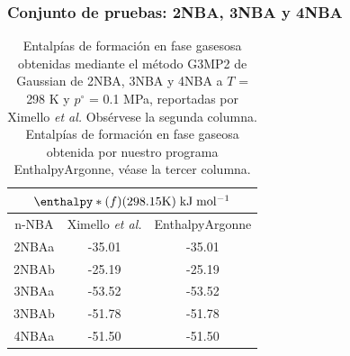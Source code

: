 \documentclass{beamer}
\begin{document}
\begin{frame}
\frametitle{Conjunto de pruebas: 2NBA, 3NBA y 4NBA}
\begin{table}[H]
\centering
\begin{tabular}{|c|c|c|}
\hline
	\multicolumn{3}{||c||}{$\enthalpy*(f){}(298.15 \mathrm{K})\; \mathrm{kJ\;mol^{-1}}$}\\
\hline
\hline
	n-NBA & Ximello \textit{et al.} & EnthalpyArgonne\\ 
\hline
2NBAa & -35.01 & -35.01\\
\hline
2NBAb & -25.19 & -25.19\\ 
\hline 
3NBAa & -53.52 & -53.52\\
\hline
3NBAb & -51.78 & -51.78\\ 
\hline
4NBAa & -51.50 & -51.50\\ 
\hline  
\end{tabular} 
	\caption{Entalpías de formación en fase gasesosa obtenidas mediante el método G3MP2 de Gaussian de 2NBA, 3NBA y 4NBA a $T$ = 298 K y $p^{\circ}$ = 0.1 MPa, reportadas por Ximello \textit{et al.} Obsérvese la segunda columna. Entalpías de formación en fase gaseosa obtenida por nuestro programa EnthalpyArgonne, véase la tercer columna.}
\label{Ximello-table-3}
\end{table}
\end{frame}

\end{document}
